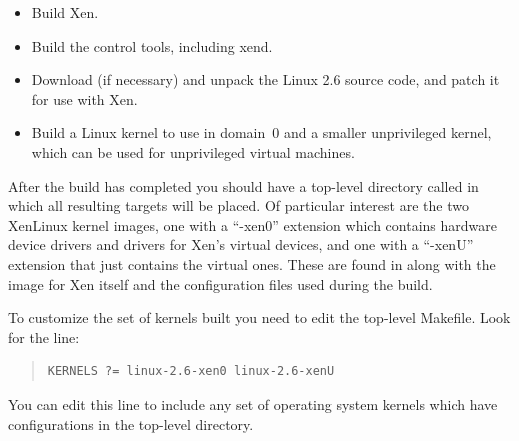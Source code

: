 \documentclass[11pt,twoside,final,openright]{report}
\def\xend{{xend}\xspace}
\begin{document}
\begin{itemize}
\item Build Xen.
\item Build the control tools, including \xend.
\item Download (if necessary) and unpack the Linux 2.6 source code, and
  patch it for use with Xen.
\item Build a Linux kernel to use in domain~0 and a smaller unprivileged
  kernel, which can be used for unprivileged virtual machines.
\end{itemize}

After the build has completed you should have a top-level directory
called  in which all resulting targets will be placed. Of
particular interest are the two XenLinux kernel images, one with a
``-xen0'' extension which contains hardware device drivers and drivers
for Xen's virtual devices, and one with a ``-xenU'' extension that
just contains the virtual ones. These are found in
 along with the image for Xen itself and the
configuration files used during the build.


To customize the set of kernels built you need to edit the top-level
Makefile. Look for the line:
\begin{quote}
\begin{verbatim}
KERNELS ?= linux-2.6-xen0 linux-2.6-xenU
\end{verbatim}
\end{quote}

You can edit this line to include any set of operating system kernels
which have configurations in the top-level 
directory.

\end{document}
